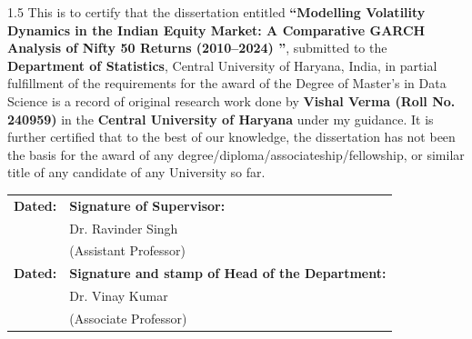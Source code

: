 \begin{spacing}{1.5} 
\noindent This is to certify that the dissertation entitled \textbf{``Modelling Volatility Dynamics in the Indian Equity Market: A Comparative GARCH Analysis of Nifty 50 Returns (2010–2024) ''}, submitted to the \textbf{Department of Statistics}, Central University of Haryana, India, in partial fulfillment of the requirements for the award of the Degree of Master's in Data Science is a record of original research work done by \textbf{Vishal Verma (Roll No. 240959)} in the \textbf{Central University of Haryana} under my guidance. It is further certified that to the best of our knowledge, the dissertation has not been the basis for the award of any degree/diploma/associateship/fellowship, or similar title of any candidate of any University so far.
\end{spacing}

\vspace*{1.5cm} 

\begin{singlespace}
\noindent
\begin{tabular}{@{}p{6cm} l@{}}
\textbf{Dated:} & \textbf{Signature of Supervisor:} \\[0.2cm]
                & Dr. Ravinder Singh \\
                & (Assistant Professor)\\[1.5cm]
\textbf{Dated:} & \textbf{Signature and stamp of Head of the Department:} \\[0.2cm]
                & Dr. Vinay Kumar \\
                &(Associate Professor)
\end{tabular}
\end{singlespace}

\vfill
\begin{center}

\end{center}





\cleardoublepage